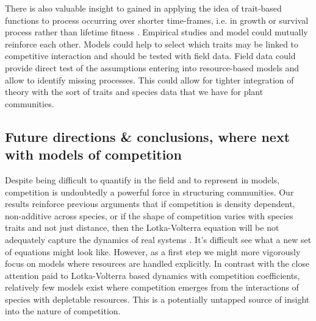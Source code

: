 \documentclass[a4paper,11pt]{article}
\begin{document}
There is also valuable insight to gained in applying the idea of
trait-based functions
to process occurring over shorter time-frames, i.e. in growth or
survival process rather than lifetime fitness
\citep[e.g.][]{Kunstler-2012, Lasky-2015, Kraft-2015}.  Empirical studies and model could mutually reinforce each other. Models could help to select which traits may be linked to competitive interaction and should be tested with field data. Field data could provide direct test of the assumptions entering into
resource-based models and allow to identify missing processes. This could allow for tighter integration of
theory with the sort of traits and species data that we have for plant
communities.

\subsection{Future directions \& conclusions, where next with models of
competition}

Despite being difficult to quantify in the field and to represent in
models, competition is undoubtedly a powerful force in structuring
communities.
%
Our results reinforce previous arguments that if competition is
density dependent, non-additive across species, or if the shape of
competition varies with species traits and not just distance, then the
Lotka-Volterra equation will be not adequately capture the dynamics of
real systems \citep{Andrewartha-1953, Neill-1974, Abrams-1975,
  Wangersky-1978,Abrams-1980, Tilman-1987}.  It's difficult see what a
new set of equations might look like.  However, as a first step we
might more vigorously focus on models where resources are handled
explicitly.  In contrast with the close attention
paid to Lotka-Volterra based dynamics with competition coefficients,
relatively few models exist where competition emerges from the
interactions of species with depletable resources. This is a potentially
untapped source of insight into the nature of competition.
\end{document}
